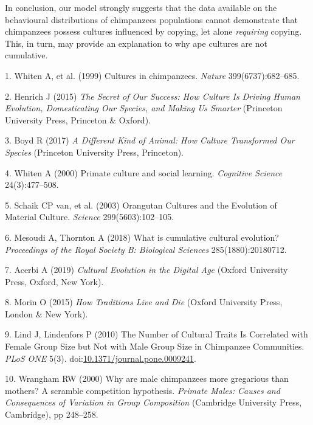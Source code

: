 \documentclass[9pt,twocolumn,twoside,]{pnas-new}
\begin{document}
In conclusion, our model strongly suggests that the data available on
the behavioural distributions of chimpanzees populations cannot
demonstrate that chimpanzees possess cultures influenced by copying, let
alone \emph{requiring} copying. This, in turn, may provide an
explanation to why ape cultures are not cumulative.

\showmatmethods
\showacknow
\pnasbreak

\hypertarget{refs}{}
\hypertarget{ref-whiten_cultures_1999}{}
1. Whiten A, et al. (1999) Cultures in chimpanzees. \emph{Nature}
399(6737):682--685.

\hypertarget{ref-henrich_secret_2015}{}
2. Henrich J (2015) \emph{The Secret of Our Success: How Culture Is
Driving Human Evolution, Domesticating Our Species, and Making Us
Smarter} (Princeton University Press, Princeton \& Oxford).

\hypertarget{ref-boyd_different_2017}{}
3. Boyd R (2017) \emph{A Different Kind of Animal: How Culture
Transformed Our Species} (Princeton University Press, Princeton).

\hypertarget{ref-whiten_primate_2000}{}
4. Whiten A (2000) Primate culture and social learning. \emph{Cognitive
Science} 24(3):477--508.

\hypertarget{ref-van_schaik_orangutan_2003}{}
5. Schaik CP van, et al. (2003) Orangutan Cultures and the Evolution of
Material Culture. \emph{Science} 299(5603):102--105.

\hypertarget{ref-mesoudi_what_2018}{}
6. Mesoudi A, Thornton A (2018) What is cumulative cultural evolution?
\emph{Proceedings of the Royal Society B: Biological Sciences}
285(1880):20180712.

\hypertarget{ref-acerbi_cultural_2019}{}
7. Acerbi A (2019) \emph{Cultural Evolution in the Digital Age} (Oxford
University Press, Oxford, New York).

\hypertarget{ref-morin_how_2015}{}
8. Morin O (2015) \emph{How Traditions Live and Die} (Oxford University
Press, London \& New York).

\hypertarget{ref-lind_number_2010}{}
9. Lind J, Lindenfors P (2010) The Number of Cultural Traits Is
Correlated with Female Group Size but Not with Male Group Size in
Chimpanzee Communities. \emph{PLoS ONE} 5(3).
doi:\href{https://doi.org/10.1371/journal.pone.0009241}{10.1371/journal.pone.0009241}.

\hypertarget{ref-wrangham_why_2000}{}
10. Wrangham RW (2000) Why are male chimpanzees more gregarious than
mothers? A scramble competition hypothesis. \emph{Primate Males: Causes
and Consequences of Variation in Group Composition} (Cambridge
University Press, Cambridge), pp 248--258.
\end{document}
